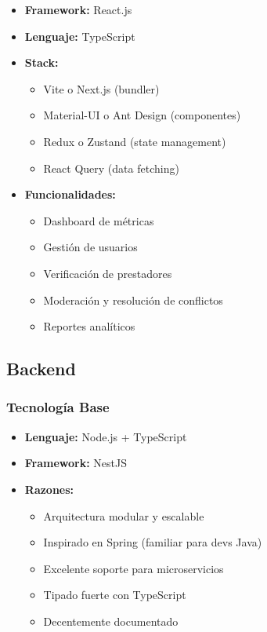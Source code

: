 \documentclass[12pt,a4paper,spanish]{article}
\begin{document}
\begin{itemize}
    \item \textbf{Framework:} React.js
    \item \textbf{Lenguaje:} TypeScript
    \item \textbf{Stack:}
    \begin{itemize}
        \item Vite o Next.js (bundler)
        \item Material-UI o Ant Design (componentes)
        \item Redux o Zustand (state management)
        \item React Query (data fetching)
    \end{itemize}
    \item \textbf{Funcionalidades:}
    \begin{itemize}
        \item Dashboard de métricas
        \item Gestión de usuarios
        \item Verificación de prestadores
        \item Moderación y resolución de conflictos
        \item Reportes analíticos
    \end{itemize}
\end{itemize}

\subsection{Backend}

\subsubsection{Tecnología Base}

\begin{itemize}
    \item \textbf{Lenguaje:} Node.js + TypeScript
    \item \textbf{Framework:} NestJS
    \item \textbf{Razones:}
    \begin{itemize}
        \item Arquitectura modular y escalable
        \item Inspirado en Spring (familiar para devs Java)
        \item Excelente soporte para microservicios
        \item Tipado fuerte con TypeScript
        \item Decentemente documentado
    \end{itemize}
\end{itemize}
\end{document}
